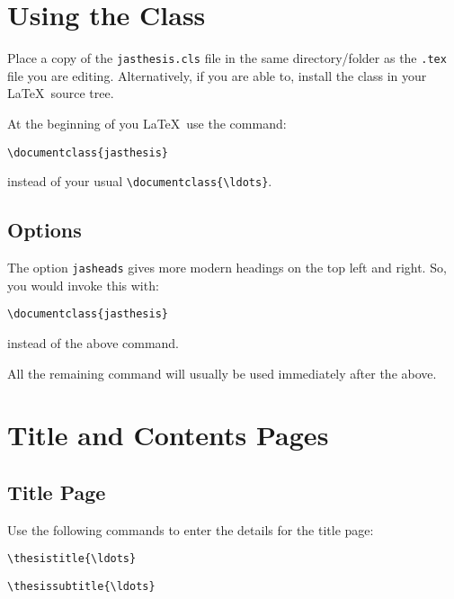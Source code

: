 \documentclass[jasheads]{jasthesis}
\begin{document}


\tableofcontents


\chapter{Using the Class}

Place a copy of the \texttt{jasthesis.cls} file in the same directory/folder
as the \texttt{.tex} file you are editing. Alternatively, if you are able to,
install the class in your \LaTeX\ source tree.

At the beginning of you \LaTeX\ use the command:

{\ttfamily\verb=\documentclass{jasthesis}=}

\noindent instead of your usual {\ttfamily\verb=\documentclass{\ldots}=}.

\section{Options}

The option {\ttfamily\verb=jasheads=} gives more modern headings on the top left
and right. So, you would invoke this with:

{\ttfamily\verb=\documentclass{jasthesis}=}

\noindent instead of the above command.

All the remaining command will usually be used immediately after the above.

\chapter{Title and Contents Pages}

\section{Title Page}

Use the following commands to enter the details for the title page:

{\ttfamily\verb=\thesistitle{\ldots}=}

{\ttfamily\verb=\thesissubtitle{\ldots}=}
\end{document}
